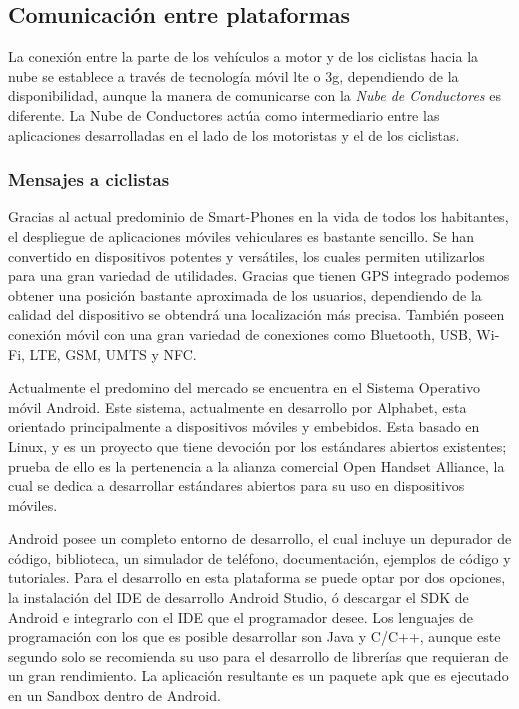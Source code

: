 \subsection{Comunicación entre plataformas}\label{ssection:comunicacion_plataformas}
La conexión entre la parte de los vehículos a motor y de los ciclistas hacia la nube se establece a través de tecnología móvil \gls{lte} o \gls{3g}, dependiendo de la disponibilidad, aunque la manera de comunicarse con la \emph{Nube de Conductores} es diferente. La Nube de Conductores actúa como intermediario entre las aplicaciones desarrolladas en el lado de los motoristas y el de los ciclistas.

\subsubsection{Mensajes a ciclistas}\label{sssection:mensajes_ciclistas}
Gracias al actual predominio de Smart-Phones en la vida de todos los habitantes, el despliegue de aplicaciones móviles vehiculares es bastante sencillo. Se han convertido en dispositivos potentes y versátiles, los cuales permiten utilizarlos para una gran variedad de utilidades. Gracias que tienen GPS integrado podemos obtener una posición bastante aproximada de los usuarios, dependiendo de la calidad del dispositivo se obtendrá una localización más precisa. También poseen conexión móvil con una gran variedad de conexiones como Bluetooth, USB, Wi-Fi, LTE, GSM, UMTS y NFC.

Actualmente el predomino del mercado se encuentra en el Sistema Operativo móvil Android. Este sistema, actualmente en desarrollo por Alphabet, esta orientado principalmente a dispositivos móviles y embebidos. Esta basado en Linux, y es un proyecto que tiene devoción por los estándares abiertos existentes; prueba de ello es la pertenencia a la alianza comercial Open Handset Alliance, la cual se dedica a desarrollar estándares abiertos para su uso en dispositivos móviles. 

Android posee un completo entorno de desarrollo, el cual incluye un depurador de código, biblioteca, un simulador de teléfono, documentación, ejemplos de código y tutoriales. Para el desarrollo en esta plataforma se puede optar por dos opciones, la instalación del IDE de desarrollo Android Studio, ó descargar el SDK de Android e integrarlo con el IDE que el programador desee. Los lenguajes de programación con los que es posible desarrollar son Java y C/C++, aunque este segundo solo se recomienda su uso para el desarrollo de librerías que requieran de un gran rendimiento. La aplicación resultante es un paquete apk que es ejecutado en un Sandbox dentro de Android.

